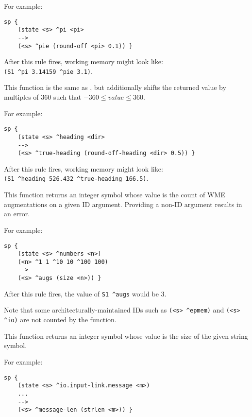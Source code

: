 \begin{description}
For example:

\begin{verbatim}
sp {
    (state <s> ^pi <pi>
    -->
    (<s> ^pie (round-off <pi> 0.1)) }
\end{verbatim}

After this rule fires, working memory might look like: \\
\verb|(S1 ^pi 3.14159 ^pie 3.1)|.


\item [\soarb{round-off-heading} --- ] This function is the same as ,
but additionally shifts the returned value by multiples of 360 such that $-360 \le value \le 360$.

For example:

\begin{verbatim}
sp {
    (state <s> ^heading <dir>
    -->
    (<s> ^true-heading (round-off-heading <dir> 0.5)) }
\end{verbatim}

After this rule fires, working memory might look like: \\
\verb|(S1 ^heading 526.432 ^true-heading 166.5)|.


\item [\soarb{size} --- ] This function returns an integer symbol whose value
is the count of WME augmentations on a given ID argument. Providing a non-ID
argument results in an error.

For example:

\begin{verbatim}
sp {
    (state <s> ^numbers <n>)
    (<n> ^1 1 ^10 10 ^100 100)
    -->
    (<s> ^augs (size <n>)) }
\end{verbatim}

After this rule fires, the value of \verb=S1 ^augs= would be $3$.

Note that some architecturally-maintained IDs such as \verb=(<s> ^epmem)= and \verb=(<s> ^io)=
are not counted by the  function.

\item [\soarb{strlen} --- ] This function returns an integer symbol whose value
is the size of the given string symbol.

For example:

\begin{verbatim}
sp {
    (state <s> ^io.input-link.message <m>)
    ...
    -->
    (<s> ^message-len (strlen <m>)) }
\end{verbatim}



\end{description}
